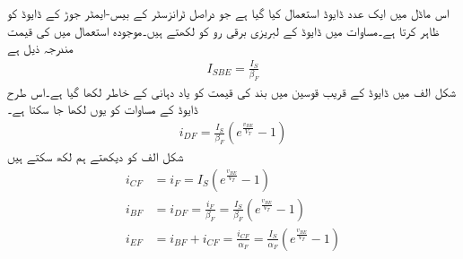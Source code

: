 اس ماڈل میں ایک عدد ڈایوڈ استعمال کیا گیا ہے جو دراصل ٹرانزسٹر  کے بیس-ایمٹر  جوڑ کے ڈایوڈ  کو ظاہر کرتا ہے۔مساوات  میں ڈایوڈ کے لبریزی برقی رو کو  لکھتے ہیں۔موجودہ استعمال میں  کی قیمت مندرجہ ذیل ہے
\begin{align}
I_{SBE}=\frac{I_S}{\beta_F}
\end{align}
شکل  الف   میں ڈایوڈ  کے قریب قوسین میں بند   کی قیمت   کو یاد دہانی کے خاطر لکھا گیا ہے۔اس طرح ڈایوڈ   کے مساوات کو یوں لکھا جا سکتا ہے۔
\begin{align}
i_{DF}=\frac{I_S}{\beta_F} \left (e^{\frac{v_{BE}}{V_T}}-1 \right )
\end{align}
شکل  الف   کو دیکھتے ہم لکھ سکتے ہیں 
\begin{align} \label{مساوات_ٹرانزسٹر_مال_برداری_سیدھے_رو}
i_{CF}&=i_F=I_S \left (e^{\frac{v_{BE}}{V_T}}-1 \right )\\
i_{BF}&=i_{DF}=\frac{i_F}{\beta_F}=\frac{I_S}{\beta_F} \left (e^{\frac{v_{BE}}{V_T}}-1 \right )\\
i_{EF}&=i_{BF}+i_{CF}=\frac{i_{CF}}{\alpha_F}=\frac{I_S}{\alpha_F} \left (e^{\frac{v_{BE}}{V_T}}-1 \right )
\end{align}

